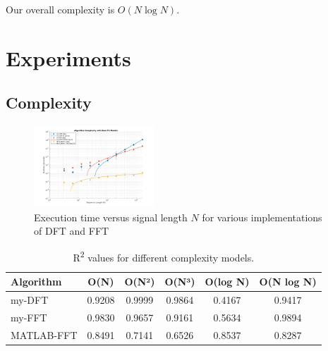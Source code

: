 \documentclass[8pt]{extarticle}
\begin{document}


Our overall complexity is $O(N\log N)$.

\section{Experiments}

\subsection{Complexity}

\begin{figure}[h]
    \centering
    \includegraphics[width=0.4\textwidth]{figures/complex.jpg}
    \caption{Execution time versus signal length $N$ for various implementations of DFT and FFT}
    \label{fig:complexity}
\end{figure}

\begin{table}[h]
    \centering
    \begin{tabular}{lccccc}
        \toprule
        Algorithm   & O(N)    & O(N²)   & O(N³)   & O(log N) & O(N log N) \\
        \midrule
        my-DFT     & 0.9208  & 0.9999  & 0.9864  & 0.4167   & 0.9417  \\
        my-FFT     & 0.9830  & 0.9657  & 0.9161  & 0.5634   & 0.9894  \\
        MATLAB-FFT & 0.8491  & 0.7141  & 0.6526  & 0.8537   & 0.8287  \\
        \bottomrule
    \end{tabular}
    \caption{R\textsuperscript{2} values for different complexity models.}
    \label{tab:R2}
\end{table}
\end{document}
